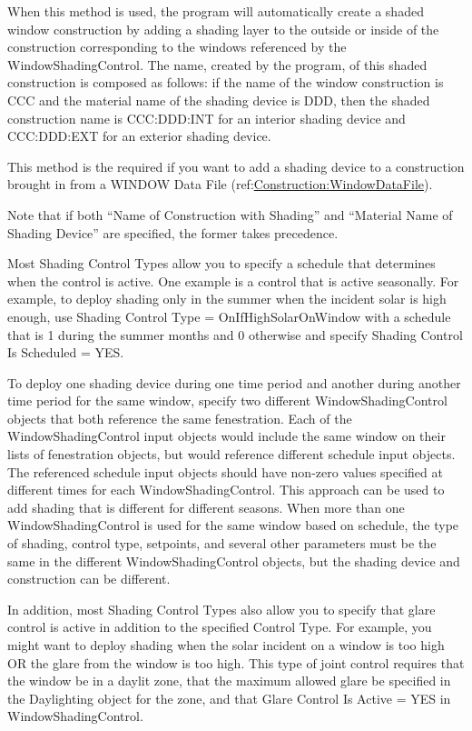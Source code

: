 \begin{itemize}
When this method is used, the program will automatically create a shaded window construction by adding a shading layer to the outside or inside of the construction corresponding to the windows referenced by the WindowShadingControl. The name, created by the program, of this shaded construction is composed as follows: if the name of the window construction is CCC and the material name of the shading device is DDD, then the shaded construction name is CCC:DDD:INT for an interior shading device and CCC:DDD:EXT for an exterior shading device.

This method is the required if you want to add a shading device to a construction brought in from a WINDOW Data File (ref:\hyperref[constructionwindowdatafile]{Construction:WindowDataFile}).

Note that if both ``Name of Construction with Shading'' and ``Material Name of Shading Device'' are specified, the former takes precedence.
\end{itemize}

Most Shading Control Types allow you to specify a schedule that determines when the control is active. One example is a control that is active seasonally. For example, to deploy shading only in the summer when the incident solar is high enough, use Shading Control Type = OnIfHighSolarOnWindow with a schedule that is 1 during the summer months and 0 otherwise and specify Shading Control Is Scheduled = YES. 

To deploy one shading device during one time period and another during another time period for the same window, specify two different WindowShadingControl objects that both reference the same fenestration.  Each of the WindowShadingControl input objects would include the same window on their lists of fenestration objects, but would reference different schedule input objects. The referenced schedule input objects should have non-zero values specified at different times for each WindowShadingControl. This approach can be used to add shading that is different for different seasons. When more than one WindowShadingControl is used for the same window based on schedule, the type of shading, control type, setpoints, and several other parameters must be the same in the different WindowShadingControl objects, but the shading device and construction can be different.

In addition, most Shading Control Types also allow you to specify that glare control is active in addition to the specified Control Type. For example, you might want to deploy shading when the solar incident on a window is too high OR the glare from the window is too high. This type of joint control requires that the window be in a daylit zone, that the maximum allowed glare be specified in the Daylighting object for the zone, and that Glare Control Is Active = YES in WindowShadingControl.

